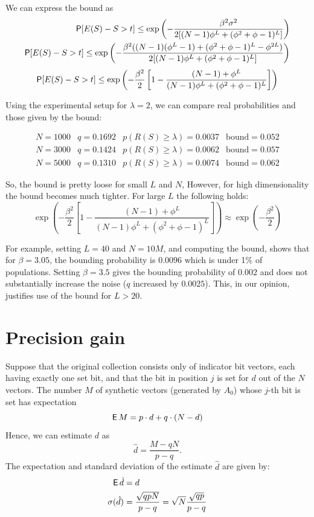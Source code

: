 \documentclass[11pt]{article}
\begin{document}
We can express the bound as
 \begin{align*}
\P[E(S) -S > t] \leq  \exp \left (- \frac{\beta^2 \sigma^2} {2 [ (N-1) \phi^L + ( \phi^2 + \phi -1)^L]} \right ) \\
\P[E(S) -S > t] \leq  \exp \left (- \frac{\beta^2 ((N-1) ( \phi^L - 1) +  ( \phi^2 + \phi -1)^L - \phi^{2L}) } {2 [ (N-1) \phi^L + ( \phi^2 + \phi -1)^L]} \right )
 \end{align*}
 \begin{align}
\P[E(S) -S > t] \leq  \exp \left (-  \frac{\beta^2}{2} \left [ 1 - \frac{(N-1) + \phi^L}{(N-1)\phi^L +  ( \phi^2 + \phi -1)^L} \right ] \right )
 \end{align}

Using the experimental setup for $\lambda = 2$, we can compare real probabilities and those given by the bound:

   \[
  \begin{matrix}N = 1000 & q = 0.1692 & p(R(S) \ge \lambda) = 0.0037  & \text{bound} = 0.052 \\
  N= 3000 & q = 0.1424 & p(R(S) \ge \lambda) = 0.0062   & \text{bound} = 0.057\\
  N=5000 & q = 0.1310 & p(R(S) \ge \lambda) = 0.0074  & \text{bound} = 0.062 \end{matrix}
 \]

So, the bound is pretty loose for small $L$ and $N$,  However, for high dimensionality the bound becomes much tighter.  For large $L$ the following holds:
 \begin{equation*}
 \exp \left (-  \frac{\beta^2}{2} \left [ 1 - \frac{(N-1) + \phi^L}{(N-1)\phi^L +  ( \phi^2 + \phi -1)^L} \right ] \right ) \approx  \exp \left (-  \frac{\beta^2}{2}  \right )
\end{equation*}

For example, setting $L=40$ and $N=10M$, and computing the bound, shows that for $\beta = 3.05$, the bounding probability is $0.0096$ which is under 1\% of populations. Setting $\beta = 3.5$ gives the bounding probability of $0.002$ and does not substantially increase the noise  ($q$ increased by $0.0025$).  This, in our opinion, justifies use of the bound for $L>20$.

\section{Precision gain}

Suppose that the original collection consists only of indicator bit vectors, each having exactly one set bit, and that the bit in position $j$ is set for $d$ out of the $N$ vectors.
The number $M$ of synthetic vectors (generated by $A_0$) whose $j$-th bit is set has expectation
\[ \EP M = p \cdot d + q \cdot (N-d) \]
Hence, we can estimate $d$ as
\[ \hat{d} = \frac{M-qN}{p-q}. \]
The expectation and standard deviation of the estimate $\hat{d}$ are given by:
\begin{align*}
\EP \hat{d} &= d \\
\sigma( \hat{d}) &= \frac{\sqrt{qpN}}{p-q} = \sqrt{N} \frac{\sqrt{qp}}{p-q}
\end{align*}
\end{document}
